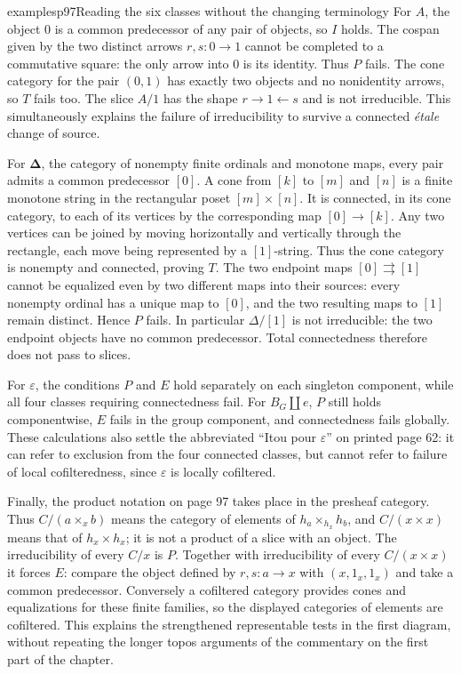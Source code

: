 \begin{dcomment}{examples}{p97}{Reading the six classes without the changing terminology}
For $A$, the object $0$ is a common predecessor of any pair of objects, so $I$ holds. The cospan given by the two distinct arrows $r,s:0\to1$ cannot be completed to a commutative square: the only arrow into $0$ is its identity. Thus $P$ fails. The cone category for the pair $(0,1)$ has exactly two objects and no nonidentity arrows, so $T$ fails too. The slice $A/1$ has the shape $r\to1\leftarrow s$ and is not irreducible. This simultaneously explains the failure of irreducibility to survive a connected \emph{\'etale} change of source.

For $\boldsymbol\Delta$, the category of nonempty finite ordinals and monotone maps, every pair admits a common predecessor $[0]$. A cone from $[k]$ to $[m]$ and $[n]$ is a finite monotone string in the rectangular poset $[m]\times[n]$. It is connected, in its cone category, to each of its vertices by the corresponding map $[0]\to[k]$. Any two vertices can be joined by moving horizontally and vertically through the rectangle, each move being represented by a $[1]$-string. Thus the cone category is nonempty and connected, proving $T$. The two endpoint maps $[0]\rightrightarrows[1]$ cannot be equalized even by two different maps into their sources: every nonempty ordinal has a unique map to $[0]$, and the two resulting maps to $[1]$ remain distinct. Hence $P$ fails. In particular $\Delta/[1]$ is not irreducible: the two endpoint objects have no common predecessor. Total connectedness therefore does not pass to slices.

For $\varepsilon$, the conditions $P$ and $E$ hold separately on each singleton component, while all four classes requiring connectedness fail. For $B_G\amalg e$, $P$ still holds componentwise, $E$ fails in the group component, and connectedness fails globally. These calculations also settle the abbreviated ``Itou pour $\varepsilon$'' on printed page 62: it can refer to exclusion from the four connected classes, but cannot refer to failure of local cofilteredness, since $\varepsilon$ is locally cofiltered.

Finally, the product notation on page 97 takes place in the presheaf category. Thus $C/(a\times_x b)$ means the category of elements of $h_a\times_{h_x}h_b$, and $C/(x\times x)$ means that of $h_x\times h_x$; it is not a product of a slice with an object. The irreducibility of every $C/x$ is $P$. Together with irreducibility of every $C/(x\times x)$ it forces $E$: compare the object defined by $r,s:a\to x$ with $(x,1_x,1_x)$ and take a common predecessor. Conversely a cofiltered category provides cones and equalizations for these finite families, so the displayed categories of elements are cofiltered. This explains the strengthened representable tests in the first diagram, without repeating the longer topos arguments of the commentary on the first part of the chapter.
\end{dcomment}

